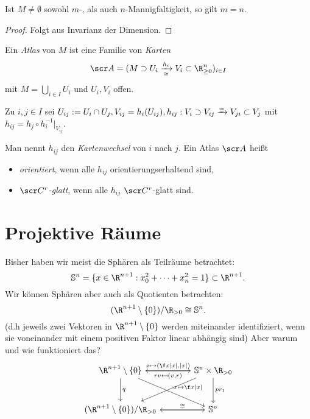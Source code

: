 \begin{st}
	Ist $M \neq \emptyset$ sowohl $m$-, als auch $n$-Mannigfaltigkeit, so gilt $m = n$.
	\begin{proof}
		Folgt aus Invarianz der Dimension.
	\end{proof}
\end{st}

\begin{df}
	Ein \emph{Atlas} von $M$ ist eine Familie von \emph{Karten}
	\[
		\scr A = (M \supset U_i \xrightarrow[\homeomorphic]{h_i} V_i \subset \R_{\ge 0}^n)_{i\in I}
	\]
	mit $M = \bigcup_{i \in I} U_i$ und $U_i, V_i$ offen.

	Zu $i,j \in I$ sei $U_{ij} := U_i \cap U_j, V_{ij} = h_i(U_{ij}), h_{ij} : V_i \supset V_{ij} \homeomorphicto V_{ji} \subset V_j$ mit $h_{ij} = h_j \circ h_i^{-1}|_{V_{ij}}$.

	Man nennt $h_{ij}$ den \emph{Kartenwechsel} von $i$ nach $j$.
	Ein Atlas $\scr A$ heißt
	\begin{itemize}
		\item
			\emph{orientiert}, wenn alle $h_{ij}$ orientierungserhaltend sind,
		\item
			\emph{$\scr C^r$-glatt}, wenn alle $h_{ij}$ $\scr C^r$-glatt sind.
	\end{itemize}
\end{df}


\section{Projektive Räume}


Bisher haben wir meist die Sphären als Teilräume betrachtet:
\[
	\S^n = \{ x \in \R^{n+1} : x_0^2 + \dotsb + x_n^2 = 1 \} \subset \R^{n+1}.
\]
Wir können Sphären aber auch als Quotienten betrachten:
\[
	(\R^{n+1} \setminus \{0\}) / \R_{>0} \homeomorphic \S^n.
\]
(d.h jeweils zwei Vektoren in $\R^{n+1} \setminus \{0\}$ werden miteinander identifiziert, wenn sie voneinander mit einem positiven Faktor linear abhängig sind)
Aber warum und wie funktioniert das?
\[
	\begin{tikzcd}[column sep=large,row sep=large]
		\R^{n+1} \setminus \{0\} \arrow{r}{x \mapsto (\f x{|x|}, |x|)} \arrow{d}{q} \arrow{dr}{x \mapsto \f x{|x|}} &
		\S^n \times \R_{>0} \arrow{l}{rv \mapsfrom (v,r)} \arrow{dl} \arrow{d}{pr_1} \\
		(\R^{n+1} \setminus \{0\}) / \R_{>0} \arrow{r}{\homeomorphic} &
		\S^n \arrow{l}{}
	\end{tikzcd}
\]

